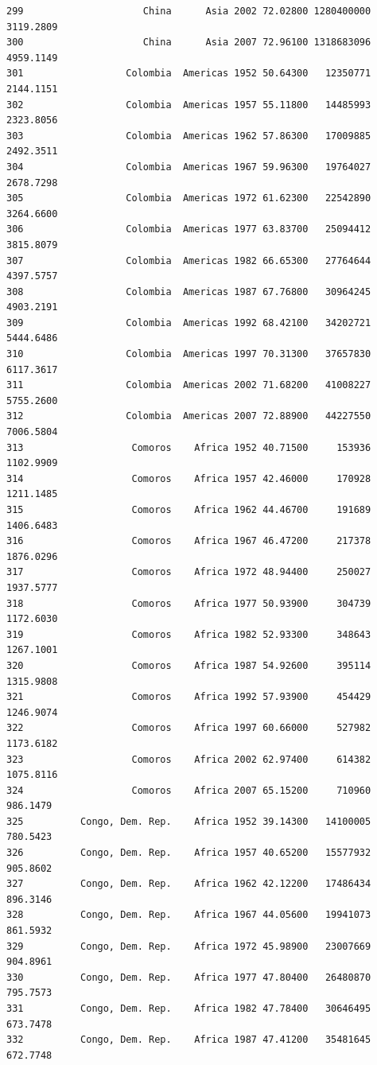 \documentclass[
  letterpaper,
  DIV=11,
  numbers=noendperiod]{scrreprt}
\begin{document}
\begin{verbatim}
299                     China      Asia 2002 72.02800 1280400000   3119.2809
300                     China      Asia 2007 72.96100 1318683096   4959.1149
301                  Colombia  Americas 1952 50.64300   12350771   2144.1151
302                  Colombia  Americas 1957 55.11800   14485993   2323.8056
303                  Colombia  Americas 1962 57.86300   17009885   2492.3511
304                  Colombia  Americas 1967 59.96300   19764027   2678.7298
305                  Colombia  Americas 1972 61.62300   22542890   3264.6600
306                  Colombia  Americas 1977 63.83700   25094412   3815.8079
307                  Colombia  Americas 1982 66.65300   27764644   4397.5757
308                  Colombia  Americas 1987 67.76800   30964245   4903.2191
309                  Colombia  Americas 1992 68.42100   34202721   5444.6486
310                  Colombia  Americas 1997 70.31300   37657830   6117.3617
311                  Colombia  Americas 2002 71.68200   41008227   5755.2600
312                  Colombia  Americas 2007 72.88900   44227550   7006.5804
313                   Comoros    Africa 1952 40.71500     153936   1102.9909
314                   Comoros    Africa 1957 42.46000     170928   1211.1485
315                   Comoros    Africa 1962 44.46700     191689   1406.6483
316                   Comoros    Africa 1967 46.47200     217378   1876.0296
317                   Comoros    Africa 1972 48.94400     250027   1937.5777
318                   Comoros    Africa 1977 50.93900     304739   1172.6030
319                   Comoros    Africa 1982 52.93300     348643   1267.1001
320                   Comoros    Africa 1987 54.92600     395114   1315.9808
321                   Comoros    Africa 1992 57.93900     454429   1246.9074
322                   Comoros    Africa 1997 60.66000     527982   1173.6182
323                   Comoros    Africa 2002 62.97400     614382   1075.8116
324                   Comoros    Africa 2007 65.15200     710960    986.1479
325          Congo, Dem. Rep.    Africa 1952 39.14300   14100005    780.5423
326          Congo, Dem. Rep.    Africa 1957 40.65200   15577932    905.8602
327          Congo, Dem. Rep.    Africa 1962 42.12200   17486434    896.3146
328          Congo, Dem. Rep.    Africa 1967 44.05600   19941073    861.5932
329          Congo, Dem. Rep.    Africa 1972 45.98900   23007669    904.8961
330          Congo, Dem. Rep.    Africa 1977 47.80400   26480870    795.7573
331          Congo, Dem. Rep.    Africa 1982 47.78400   30646495    673.7478
332          Congo, Dem. Rep.    Africa 1987 47.41200   35481645    672.7748

\end{verbatim}
\end{document}
